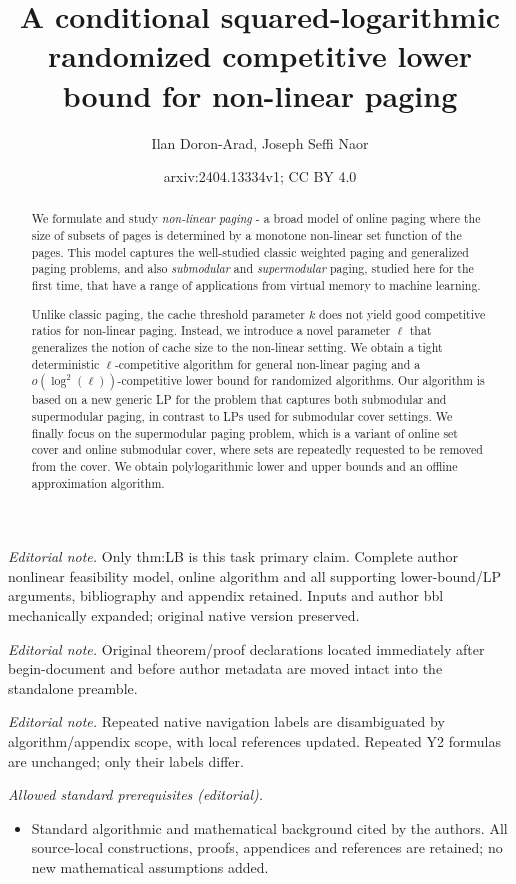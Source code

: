\documentclass[11pt]{article}
\title{A conditional squared-logarithmic randomized competitive lower bound for non-linear paging}
\author{Ilan Doron-Arad, Joseph Seffi Naor}
\date{arxiv:2404.13334v1; CC BY 4.0}
\begin{document}
\maketitle
\noindent\textit{Editorial note.} Only thm:LB is this task primary claim. Complete author nonlinear feasibility model, online algorithm and all supporting lower-bound/LP arguments, bibliography and appendix retained. Inputs and author bbl mechanically expanded; original native version preserved.\par\medskip
\noindent\textit{Editorial note.} Original theorem/proof declarations located immediately after begin-document and before author metadata are moved intact into the standalone preamble.\par\medskip
\noindent\textit{Editorial note.} Repeated native navigation labels are disambiguated by algorithm/appendix scope, with local references updated. Repeated Y2 formulas are unchanged; only their labels differ.\par\medskip
\noindent\textit{Allowed standard prerequisites (editorial).}\begin{itemize}
\item Standard algorithmic and mathematical background cited by the authors. All source-local constructions, proofs, appendices and references are retained; no new mathematical assumptions added.
\end{itemize}\medskip



\begin{abstract}
We formulate and study {\em non-linear paging} - a broad model of online paging where the size of subsets of pages is determined by a monotone non-linear set function of the pages. This model captures the well-studied classic weighted paging and generalized paging problems, and also {\em submodular} and {\em supermodular} paging, studied here for the first time, that have a range of applications from virtual memory to machine learning. 

Unlike classic paging, the cache threshold parameter $k$ does not yield good competitive ratios for non-linear paging. Instead, we introduce a novel parameter $\ell$ that generalizes the notion of cache size to the non-linear setting. We obtain a tight deterministic $\ell$-competitive algorithm for general non-linear paging and a $o\left(\log^2 (\ell)\right)$-competitive lower bound for randomized algorithms. Our algorithm is based on a new generic LP for the problem that captures both submodular and supermodular paging, in contrast to LPs used for submodular cover settings. 
We finally focus on the supermodular paging problem, which is a variant of online set cover and online submodular cover, where sets are repeatedly requested to be removed from the cover. We obtain  polylogarithmic lower and upper bounds and an offline approximation algorithm.  

\end{abstract}
\end{document}
